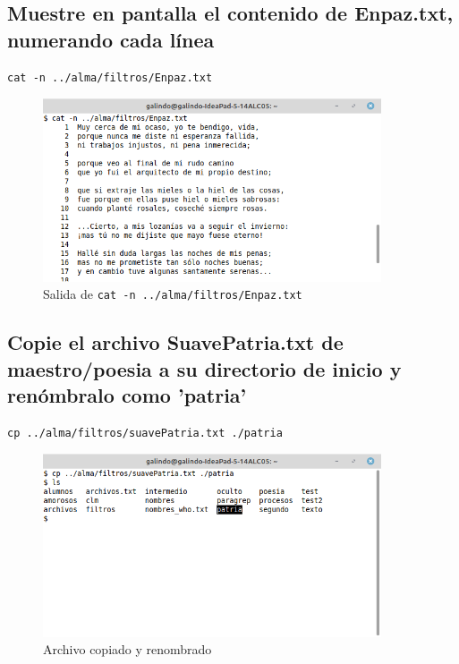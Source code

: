 \documentclass[11pt]{article}
\begin{document}
\cite{linux_cat}

\subsection{Muestre en pantalla el contenido de Enpaz.txt, numerando cada línea}
\label{sec:org0c81fc1}
\begin{verbatim}
cat -n ../alma/filtros/Enpaz.txt
\end{verbatim}

\begin{figure}[htbp]
\centering
\includegraphics[width=10cm]{img/a8.png}
\caption[\texttt{cat -n ../alma/filtros/Enpaz.txt}]{Salida de \texttt{cat -n ../alma/filtros/Enpaz.txt}}
\end{figure}

\cite{linux_cat}

\pagebreak

\subsection{Copie el archivo SuavePatria.txt de maestro/poesia a su directorio de inicio y renómbralo como 'patria'}
\label{sec:org7f88729}
\begin{verbatim}
cp ../alma/filtros/suavePatria.txt ./patria
\end{verbatim}

\begin{figure}[htbp]
\centering
\includegraphics[width=10cm]{img/a9.png}
\caption{Archivo copiado y renombrado}
\end{figure}
\end{document}
